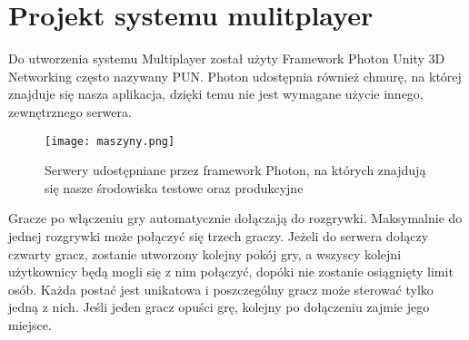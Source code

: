 \section{Projekt systemu mulitplayer}
Do utworzenia systemu Multiplayer został użyty Framework Photon Unity 3D Networking często nazywany PUN. 
Photon udostępnia również chmurę, na której znajduje się nasza aplikacja, dzięki temu nie jest wymagane użycie innego, zewnętrznego serwera. 
\begin{figure}[H]
	\center
	\texttt{[image: maszyny.png]}
	\caption{Serwery udostępniane przez framework Photon, na których znajdują się nasze środowiska testowe oraz produkcyjne}
\end{figure}
Gracze po włączeniu gry automatycznie dołączają do rozgrywki. Maksymalnie do jednej rozgrywki może połączyć się trzech graczy. Jeżeli do serwera dołączy czwarty gracz, zostanie utworzony kolejny pokój gry, a wszyscy kolejni użytkownicy będą mogli się z nim połączyć, dopóki nie zostanie osiągnięty limit osób. 
Każda postać jest unikatowa i poszczególny gracz może sterować tylko jedną z nich. Jeśli jeden gracz opuści grę, kolejny po dołączeniu zajmie jego miejsce. 
